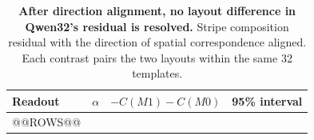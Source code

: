\begin{table}[!htb]
\centering\footnotesize
\caption{\textbf{After direction alignment, no layout difference in Qwen32's residual is resolved.} Stripe composition residual with the direction of spatial correspondence aligned. Each contrast pairs the two layouts within the same 32 templates.}
\begin{tabular}{@{}lcll@{}}
\toprule
\rowcolor{DSTableHeader}
Readout & $\alpha$ & $-C(M1)-C(M0)$ & 95\% interval \\
\midrule
@@ROWS@@
\bottomrule
\end{tabular}
\label{tab:composition_aligned}
\end{table}

